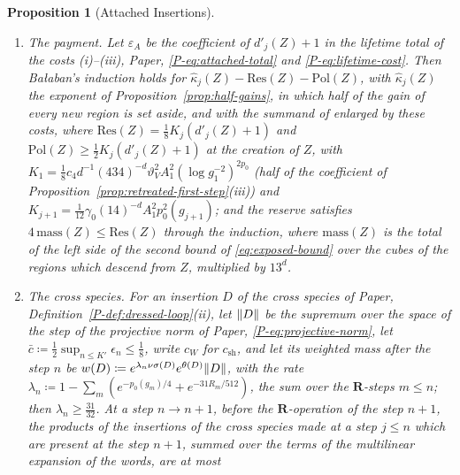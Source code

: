 \documentclass[11pt]{preprint}
\DeclarePairedDelimiter{\abs}{\lvert}{\rvert}
\DeclarePairedDelimiter{\norm}{\lVert}{\rVert}
\numberwithin{equation}{section}
\newtheorem{proposition}{Proposition}
\theoremstyle{definition}
\theoremstyle{remark}
\theoremstyle{plain}
\begin{document}
\begin{proposition}[Attached Insertions]
\begin{enumerate}[label=(\roman*)]
\begin{equation}\label{eq:exposed-bound}
    \sum_{X \ni \mathfrak n}\abs{e^{(k+1)}_X}e^{\theta(X)} \leq C\hat\tau_{k+1}^2\;,
    \qquad
    \sum_{X \cap Q \neq \emptyset}\abs{e^{(k+1)}_X}e^{\frac{\nu}{64}\#_{k+1}(X)} \leq C'_{\mathrm{lt}}MR_{k+1}\hat\tau_{k+1}^2\;,
\end{equation}
for every traversal $\mathfrak n$ and every cube $Q$ of side $MR_{k+1}$, with $\hat\tau^2_{k+1} = \max(\tau^2_{k+1}, C\hat\rho_{k+1})$ and constants of the class.
\item \emph{The payment.} Let $\varepsilon_A$ be the coefficient of $d'_j(Z) + 1$ in the lifetime total of the costs (i)--(iii), Paper, \eqref{P-eq:attached-total} and \eqref{P-eq:lifetime-cost}. Then Ba{\l}aban's induction \cite[pp.~384--389]{BalabanLFR2} holds for $\hat\kappa_j(Z) - \mathrm{Res}(Z) - \mathrm{Pol}(Z)$, with $\hat\kappa_j(Z)$ the exponent of Proposition~\ref{prop:half-gains}, in which half of the gain of every new region is set aside, and with the summand of \cite[(1.80)]{BalabanLFR2} enlarged by these costs, where $\mathrm{Res}(Z) = \frac18K_j(d'_j(Z) + 1)$ and $\mathrm{Pol}(Z) \geq \frac12K_j(d'_j(Z) + 1)$ at the creation of $Z$, with $K_1 = \frac18c_4d^{-1}(434)^{-d}\vartheta_V^2A_1^2(\log g_1^{-2})^{2p_0}$ (half of the coefficient of Proposition~\ref{prop:retreated-first-step}(iii)) and $K_{j+1} = \frac{1}{12}\gamma_0(14)^{-d}A_1^2p_0^2(g_{j+1})$; and the reserve satisfies $4\,\mathrm{mass}(Z) \leq \mathrm{Res}(Z)$ through the induction, where $\mathrm{mass}(Z)$ is the total of the left side of the second bound of \eqref{eq:exposed-bound} over the cubes of the regions which descend from $Z$, multiplied by $13^d$.
\item \emph{The cross species.} For an insertion $D$ of the cross species of Paper, Definition~\ref{P-def:dressed-loop}(ii), let $\norm D$ be the supremum over the space of the step of the projective norm of Paper, \eqref{P-eq:projective-norm}, let $\bar c \coloneqq \frac12\sup_{n \leq K'}\epsilon_n \leq \frac18$, write $c_W$ for $c_{\mathrm{sh}}$, and let its weighted mass after the step $n$ be $w(D) \coloneqq e^{\lambda_n\nu\sigma(D)}e^{\theta(D)}\norm D$, with the rate $\lambda_n \coloneqq 1 - \sum_m(e^{-p_0(g_m)/4} + e^{-31R_m/512})$, the sum over the $\mathbf R$-steps $m \leq n$; then $\lambda_n \geq \frac{31}{32}$. At a step $n \to n + 1$, before the $\mathbf R$-operation of the step $n + 1$, the products of the insertions of the cross species made at a step $j \leq n$ which are present at the step $n + 1$, summed over the terms of the multilinear expansion of the words, are at most

\end{enumerate}
\end{proposition}
\end{document}
